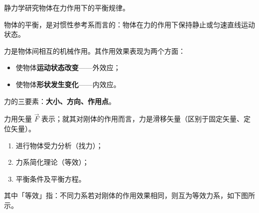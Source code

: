 
静力学研究物体在力作用下的平衡规律。


\begin{definition}[平衡]
物体的平衡，是对惯性参考系而言的：物体在力的作用下保持静止或匀速直线运动状态。
\end{definition}

\begin{definition}[力]
力是物体间相互的机械作用。其作用效果表现为两个方面：
\begin{itemize}
  \item 使物体\textbf{运动状态改变}——外效应；
  \item 使物体\textbf{形状发生变化}——内效应。
\end{itemize}
力的三要素：\textbf{大小、方向、作用点}。
\end{definition}

力用矢量 $\vec{F}$ 表示；就其对刚体的作用而言，力是滑移矢量（区别于固定矢量、定位矢量）。


\begin{enumerate}
  \item 进行物体受力分析（找力）；
  \item 力系简化理论（等效）；
  \item 平衡条件及平衡方程。
\end{enumerate}

其中「等效」指：不同力系若对刚体的作用效果相同，则互为等效力系，如下图所示。

\begin{center}
\end{center}

